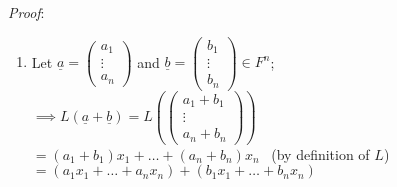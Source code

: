 \documentclass[
  12pt,
  a4paper,
  twoside]{article}
\theoremstyle{plain}
\theoremstyle{definition}
\begin{document}
\emph{Proof}:

\begin{enumerate}
\def\labelenumi{(\alph{enumi})}
\item
  Let \(\underline{a} = \begin{pmatrix} a_{1} \\ \vdots \\ a_{n} \end{pmatrix}\) and \(\underline{b} = \begin{pmatrix} b_{1} \\ \vdots \\ b_{n} \end{pmatrix} \in F^{n}\);\\
  \(\implies L(\underline{a} + \underline{b}) = L \left( \begin{pmatrix} a_{1} + b_{1} \\ \vdots \\ a_{n} + b_{n} \end{pmatrix} \right)\)\\
  \hspace*{0.333em}\hspace*{0.333em}\hspace*{0.333em}\hspace*{0.333em}\hspace*{0.333em}\hspace*{0.333em}\hspace*{0.333em}\hspace*{0.333em}\hspace*{0.333em}\hspace*{0.333em}\hspace*{0.333em}\hspace*{0.333em} \(= (a_{1} + b_{1})x_{1} + \dots + (a_{n} + b_{n})x_{n}\)
  \hfill~{(by definition of \(L\))}\\
  \hspace*{0.333em}\hspace*{0.333em}\hspace*{0.333em}\hspace*{0.333em}\hspace*{0.333em}\hspace*{0.333em}\hspace*{0.333em}\hspace*{0.333em}\hspace*{0.333em}\hspace*{0.333em}\hspace*{0.333em}\hspace*{0.333em} \(= (a_{1}x_{1} + \dots + a_{n}x_{n}) + (b_{1}x_{1} + \dots + b_{n}x_{n})\)\\

\end{enumerate}
\end{document}
